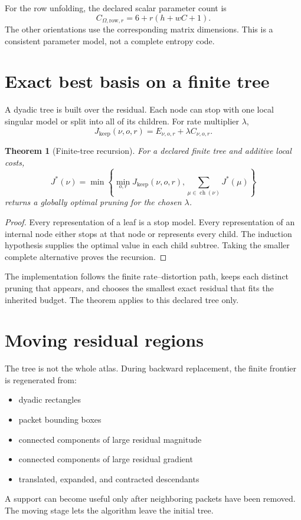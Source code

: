 \documentclass[11pt]{article}
\newtheorem{theorem}{Theorem}[section]
\theoremstyle{definition}
\theoremstyle{remark}
\begin{document}
For the row unfolding, the declared scalar parameter count is
\[
C_{\Omega,\mathrm{row},r}=6+r(h+wC+1).
\]
The other orientations use the corresponding matrix dimensions. This is a consistent parameter model, not a complete entropy code.

\section{Exact best basis on a finite tree}
A dyadic tree is built over the residual. Each node can stop with one local singular model or split into all of its children. For rate multiplier $\lambda$,
\[
J_{\mathrm{keep}}(\nu,o,r)=E_{\nu,o,r}+\lambda C_{\nu,o,r}.
\]

\begin{theorem}[Finite-tree recursion]
For a declared finite tree and additive local costs,
\[
J^*(\nu)=\min\left\{
\min_{o,r}J_{\mathrm{keep}}(\nu,o,r),
\sum_{\mu\in\operatorname{ch}(\nu)}J^*(\mu)
\right\}
\]
returns a globally optimal pruning for the chosen $\lambda$.
\end{theorem}

\begin{proof}
Every representation of a leaf is a stop model. Every representation of an internal node either stops at that node or represents every child. The induction hypothesis supplies the optimal value in each child subtree. Taking the smaller complete alternative proves the recursion.
\end{proof}

The implementation follows the finite rate--distortion path, keeps each distinct pruning that appears, and chooses the smallest exact residual that fits the inherited budget. The theorem applies to this declared tree only.

\section{Moving residual regions}
The tree is not the whole atlas. During backward replacement, the finite frontier is regenerated from:
\begin{itemize}
\item dyadic rectangles
\item packet bounding boxes
\item connected components of large residual magnitude
\item connected components of large residual gradient
\item translated, expanded, and contracted descendants
\end{itemize}
A support can become useful only after neighboring packets have been removed. The moving stage lets the algorithm leave the initial tree.
\end{document}
